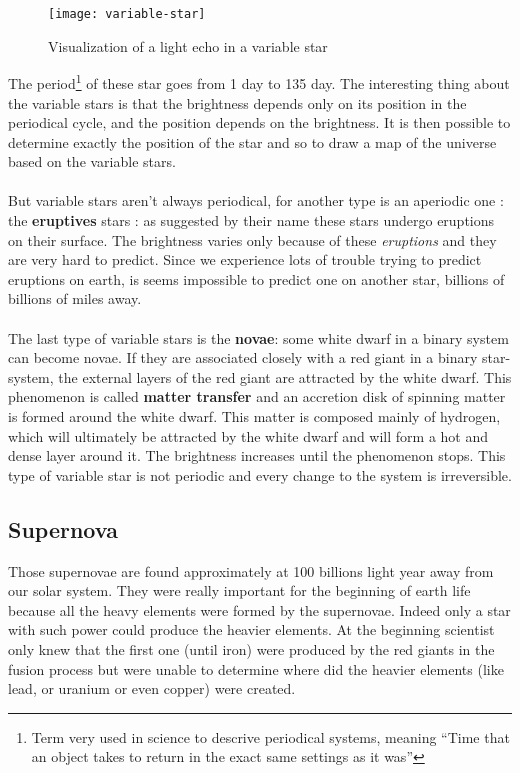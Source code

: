 \documentclass[a4paper, 11pt]{article} %
\begin{document}
\begin{figure}[h]
\centering
\texttt{[image: variable-star]}
\caption{Visualization of a light echo in a variable star}
\end{figure}

The period\footnote{Term very used in science to descrive periodical systems, meaning ``Time that an object takes to return in the exact same settings as it was''}  of these star goes from 1 day to 135 day. The interesting thing about the variable stars is that the brightness depends only on its position in the periodical cycle, and the position depends on the brightness. It is then possible to determine exactly the position of the star and so to draw a map of the universe based on the variable stars.
 
\paragraph*{} 
But variable stars aren't always periodical, for another type is an aperiodic one : the \textbf{eruptives} stars : as suggested by their name these stars undergo eruptions on their surface. The brightness varies only because of these \textit{eruptions} and they are very hard to predict. Since we experience lots of trouble trying to predict eruptions on earth, is seems impossible to predict one on another star, billions of billions of miles away.

\paragraph*{}
The last type of variable stars is the \textbf{novae}: some white dwarf in a binary system can become novae. If they are associated closely with a red giant in a binary star-system, the external layers of the red giant are attracted by the white dwarf. This phenomenon is called \textbf{matter transfer} and an accretion disk of spinning matter is formed around the white dwarf. This matter is composed mainly of hydrogen, which will ultimately be attracted by the white dwarf and will form a hot and dense layer around it. The brightness increases until the phenomenon stops. This type of variable star is not periodic and every change to the system is irreversible. 


\subsection{Supernova}

Those supernovae are found approximately at 100 billions light year away from our solar system. They were really important for the beginning of earth life because all the heavy elements were formed by the supernovae. Indeed only a star with such power could produce the heavier elements. At the beginning scientist only knew that the first one (until iron) were produced by the red giants in the fusion process but were unable to determine where did the heavier elements (like lead, or uranium or even copper) were created.
\end{document}

